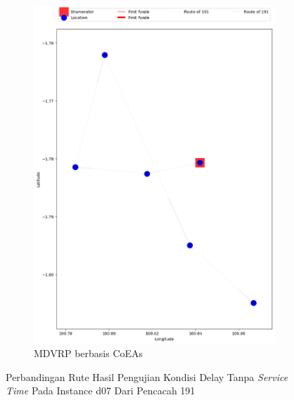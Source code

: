 \begin{figure}[H]
	\centering
	\begin{subfigure}[t]{\textwidth}
		\centering
		\includegraphics[width=\textwidth]{Resources/Images/delayed_7/real_m15_n100_delayed_7_191_coes}
		\caption{MDVRP berbasis CoEAs}
		\label{fig:real_m15_n100_delayed_7_191_coes}
	\end{subfigure}
	\caption{Perbandingan Rute Hasil Pengujian Kondisi Delay Tanpa \textit{Service Time} Pada Instance d07 Dari Pencacah 191}
	\label{fig:real_m15_n100_delayed_7_191}
\end{figure}


